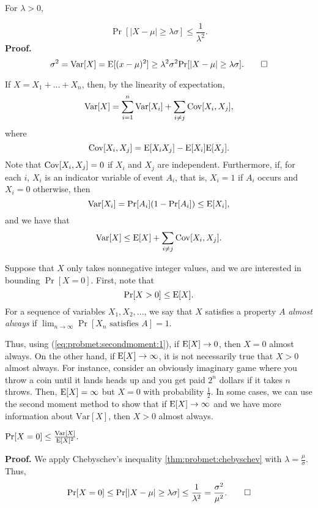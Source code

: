 \begin{theorem}\label{thm:probmet:chebyschev}
    For $\lambda > 0$,
\end{theorem}
\[\Pr[|X - \mu| \geq \lambda \sigma] \leq \frac{1}{\lambda^2}.\]
\textbf{Proof. } 
\[\sigma^2 = \Var[X] = \EE[(x - \mu)^2] \geq \lambda^2\sigma^2 \Pr[|X - \mu| \geq \lambda \sigma]. \qed\]

If $X = X_1 + ... + X_n$, then, by the linearity of expectation,
\[\Var[X] = \sum_{i = 1}^{n}\Var[X_i] + \sum_{i \neq j}\Cov[X_i, X_j],\]
where 
\[\Cov[X_i, X_j] = \EE[X_iX_j] - \EE[X_i]\EE[X_j].\] 
Note that $\Cov[X_i, X_j] = 0$ if $X_i$ and $X_j$ are independent. Furthermore, if, for each $i$, $X_i$ is an indicator variable of event $A_i$, that is, $X_i = 1$ if $A_i$ occurs and $X_i = 0$ otherwise, then
\[\Var[X_i] = \Pr[A_i](1 - \Pr[A_i]) \leq \EE[X_i],\]
and we have that
\begin{equation}
    \Var[X] \leq \EE[X] + \sum_{i \neq j} \Cov[X_i, X_j].
\end{equation}

Suppose that $X$ only takes nonnegative integer values, and we are interested in bounding $\Pr[X = 0]$. First, note that 
\begin{equation}\label{eq:probmet:secondmoment:1}
    \Pr[X > 0] \leq \EE[X].   
\end{equation}
For a sequence of variables $X_1, X_2, ...$, we say that $X$ satisfies a property $A$ \textit{almost always} if $\lim_{n \to \infty} \Pr[X_n \text{ satisfies } A] = 1$. \par
Thus, using (\ref{eq:probmet:secondmoment:1}), if $\EE[X] \to 0$, then $X = 0$ almost always. On the other hand, if $\EE[X] \to \infty$, it is not necessarily true that $X > 0$ almost always. For instance, consider an obviously imaginary game where you throw a coin until it lands heads up and you get paid $2^n$ dollars if it takes $n$ throws. Then, $\EE[X] = \infty$ but $X = 0$ with probability $\frac{1}{2}$. In some cases, we can use the second moment method to show that if $\EE[X] \to \infty$ and we have more information about $\text{Var}[X]$, then $X > 0$ almost always. \par

\begin{theorem}\label{thm:probmet:secondmoment:1}
    \(\Pr[X = 0] \leq \frac{\Var[X]}{\EE[X]^2}.\)
\end{theorem}

\textbf{Proof. } We apply Chebyschev's inequality \ref{thm:probmet:chebyschev} with $\lambda = \frac{\mu}{\sigma}$. Thus, 
\[\Pr[X = 0] \leq \Pr[|X - \mu| \geq \lambda \sigma] \leq \frac{1}{\lambda^2} = \frac{\sigma^2}{\mu^2}. \qed \]

